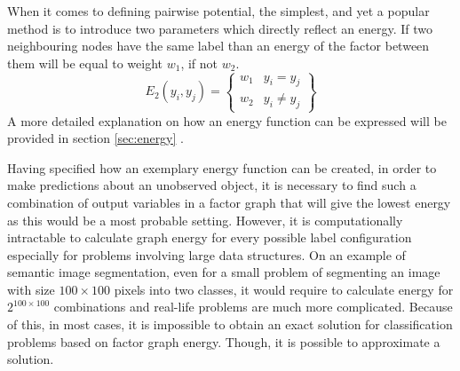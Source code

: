 When it comes to defining pairwise potential, the simplest, and yet a popular method is to introduce two parameters which directly reflect an energy. If two neighbouring nodes have the same label than an energy of the factor between them will be equal to weight $w_1$, if not $w_2$.
\begin{equation}
    E_2(y_i,y_j)=\begin{Bmatrix}
     w_1 & y_i=y_j \\ 
     w_2 & y_i \neq y_j
    \end{Bmatrix}
\end{equation}
A more detailed explanation on how an energy function can be expressed will be provided in section \ref{sec:energy} . 

Having specified how an exemplary energy function can be created, in order to make predictions about an unobserved object, it is necessary to find such a combination of output variables in a factor graph that will give the lowest energy as this would be a most probable setting. However, it is computationally intractable to calculate graph energy for every possible label configuration especially for problems involving large data structures. On an example of semantic image segmentation, even for a small problem of segmenting an image with size $100\times100$ pixels into two classes, it would require to calculate energy for $2^{100\times100}$ combinations and real-life problems are much more complicated. Because of this, in most cases, it is impossible to obtain an exact solution for classification problems based on factor graph energy. Though, it is possible to approximate a solution.